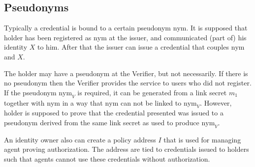 \documentclass[a4paper]{article}
\begin{document}
\subsection{Pseudonyms}
Typically a credential is bound to a certain pseudonym $\mathrm{nym}$. It is supposed that holder has been registered as $\mathrm{nym}$ at the issuer, and communicated (part of) his identity $X$ to him. After  that the issuer can issue a credential that couples $\mathrm{nym}$ and $X$.

The holder may have a pseudonym at the Verifier, but not necessarily. If there is no pseudonym then the Verifier provides the service to users who did not register. If the pseudonym $\mathrm{nym}_V$ is required, it can be generated from a link secret $m_1$ together with $\mathrm{nym}$ in a way that $\mathrm{nym}$ can not be linked to $\mathrm{nym}_V$. However, holder is supposed to prove that the credential presented was issued to a pseudonym derived from the same link secret as used to produce $\mathrm{nym}_V$.

An identity owner also can create a policy address $I$ that is used for managing agent proving authorization. The address are tied to credentials issued to holders such that agents cannot use these credentials without authorization.

\begin{comment}

\section{Simple example}

 Government (Issuer $G$) issues credentials with age and photo hash. Company ABC-Co (Issuer $A$) issues a credential that includes start-date and employment status, e.g., 'FULL-TIME'.

Holder establishes a pseudonym with both issuers. Then he got two credentials independently. After that he proves
to Verifier that he has two credentials such that
\begin{itemize}
\item The same link secret is used in both credentials;
\item The age value in the first credential is over 20;
\item The employment status is 'FULL-TIME'.
\end{itemize}

Steps in Section~\ref{sec:iss-setup} must be executed for each issuer.

Issuer and holder mutually trust each other in submitting values of the right format
during credential's issuance. This trust can be eliminated at the cost of some extra steps.

\subsection{Functionality}

In this description of the protocol, holder has two attributes he hides from issuer -- his link secret and policy address. However, the protocol allows for any number of attributes to be hidden from issuers.
\end{comment}
\end{document}
